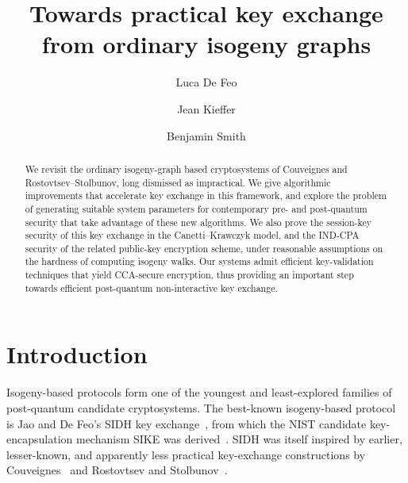 \documentclass{llncs}
\begin{document}
\title{Towards practical key exchange\\ from ordinary isogeny graphs}
\author{
  Luca De Feo \and
  Jean Kieffer \and
  Benjamin Smith}

\maketitle

\begin{abstract}
    We revisit the ordinary isogeny-graph based cryptosystems
    of Couveignes and Rostovtsev--Stolbunov,
    long dismissed as impractical.
    We give algorithmic improvements that accelerate key exchange
    in this framework,
    and explore the problem of generating suitable system parameters
    for contemporary pre- and post-quantum security that take
		advantage of these new algorithms.
    We also prove the session-key security of this key exchange
    in the Canetti--Krawczyk model,
    and the IND-CPA security of the related public-key encryption scheme,
    under reasonable assumptions on the hardness of computing isogeny walks.
    Our systems admit efficient key-validation techniques that
    yield CCA-secure encryption,
    thus providing an important step towards
    efficient post-quantum non-interactive key exchange.

\end{abstract}

\section{Introduction}
\label{sec:introduction}

Isogeny-based protocols
form one of the youngest and least-explored
families of post-quantum candidate cryptosystems.
The best-known isogeny-based protocol
is Jao and De Feo's SIDH key exchange~\cite{jao+defeo2011},
from which the NIST candidate key-encapsulation mechanism
SIKE was derived~\cite{SIKE,NIST2016}.
SIDH was itself inspired by earlier,
lesser-known,
and apparently less practical key-exchange constructions
by Couveignes~\cite{cryptoeprint:2006:291}
and Rostovtsev and
Stolbunov~\cite{rostovtsev+stolbunov06,stolbunov-red,Stol}.
\end{document}
